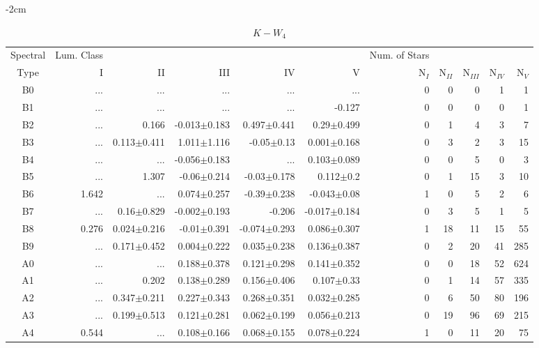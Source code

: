 \begin{table}[t]
\tiny
\centering
\caption{$K-W_{4}$}
\begin{center}
    \addtolength{\leftskip} {-2cm}
    \addtolength{\rightskip}{-2cm}
    \begin{tabular}{c|rrrrr|rrrrr}
    \toprule
    Spectral & Lum. Class & & & & & Num. of Stars & & & &  \\
    Type & I & II & III &  IV & V & N$_{I}$ & N$_{II}$ & N$_{III}$ & N$_{IV}$ & N$_{V}$ \\ \midrule
B0	&	 ...	&	 ...	&	 ...	&	 ...	&	 ...	&	0	&	0	&	0	&	1	&	1	\\
B1	&	 ...	&	 ...	&	 ...	&	 ...	&	-0.127	&	0	&	0	&	0	&	0	&	1	\\
B2	&	 ...	&	0.166	&	-0.013$\pm$0.183	&	0.497$\pm$0.441	&	0.29$\pm$0.499	&	0	&	1	&	4	&	3	&	7	\\
B3	&	 ...	&	0.113$\pm$0.411	&	1.011$\pm$1.116	&	-0.05$\pm$0.13	&	0.001$\pm$0.168	&	0	&	3	&	2	&	3	&	15	\\
B4	&	 ...	&	 ...	&	-0.056$\pm$0.183	&	 ...	&	0.103$\pm$0.089	&	0	&	0	&	5	&	0	&	3	\\
B5	&	 ...	&	1.307	&	-0.06$\pm$0.214	&	-0.03$\pm$0.178	&	0.112$\pm$0.2	&	0	&	1	&	15	&	3	&	10	\\
B6	&	1.642	&	 ...	&	0.074$\pm$0.257	&	-0.39$\pm$0.238	&	-0.043$\pm$0.08	&	1	&	0	&	5	&	2	&	6	\\
B7	&	 ...	&	0.16$\pm$0.829	&	-0.002$\pm$0.193	&	-0.206	&	-0.017$\pm$0.184	&	0	&	3	&	5	&	1	&	5	\\
B8	&	0.276	&	0.024$\pm$0.216	&	-0.01$\pm$0.391	&	-0.074$\pm$0.293	&	0.086$\pm$0.307	&	1	&	18	&	11	&	15	&	55	\\
B9	&	 ...	&	0.171$\pm$0.452	&	0.004$\pm$0.222	&	0.035$\pm$0.238	&	0.136$\pm$0.387	&	0	&	2	&	20	&	41	&	285	\\
A0	&	 ...	&	 ...	&	0.188$\pm$0.378	&	0.121$\pm$0.298	&	0.141$\pm$0.352	&	0	&	0	&	18	&	52	&	624	\\
A1	&	 ...	&	0.202	&	0.138$\pm$0.289	&	0.156$\pm$0.406	&	0.107$\pm$0.33	&	0	&	1	&	14	&	57	&	335	\\
A2	&	 ...	&	0.347$\pm$0.211	&	0.227$\pm$0.343	&	0.268$\pm$0.351	&	0.032$\pm$0.285	&	0	&	6	&	50	&	80	&	196	\\
A3	&	 ...	&	0.199$\pm$0.513	&	0.121$\pm$0.281	&	0.062$\pm$0.199	&	0.056$\pm$0.213	&	0	&	19	&	96	&	69	&	215	\\
A4	&	0.544	&	 ...	&	0.108$\pm$0.166	&	0.068$\pm$0.155	&	0.078$\pm$0.224	&	1	&	0	&	11	&	20	&	75	\\

\end{tabular}
\end{center}
\end{table}
